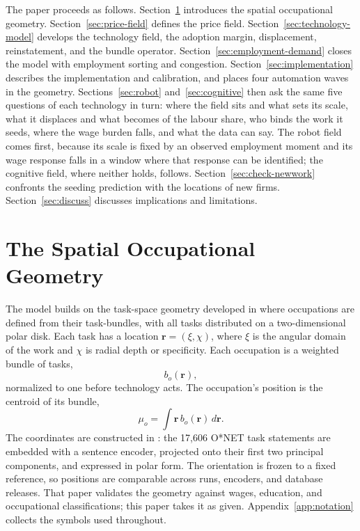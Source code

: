 \documentclass[12pt, a4paper]{article}
\begin{document}
The paper proceeds as follows.
Section~\ref{sec:geometry} introduces the spatial occupational
geometry. Section~\ref{sec:price-field} defines the price field.
Section~\ref{sec:technology-model} develops the technology field, the
adoption margin, displacement, reinstatement, and the bundle operator.
Section~\ref{sec:employment-demand} closes the model with employment
sorting and congestion.
Section~\ref{sec:implementation} describes the implementation and
calibration, and places four automation waves in the geometry.
Sections~\ref{sec:robot} and~\ref{sec:cognitive} then ask the same five
questions of each technology in turn: where the field sits and what sets
its scale, what it displaces and what becomes of the labour share, who
binds the work it seeds, where the wage burden falls, and what the data
can say. The robot field comes first, because its scale is fixed by an
observed employment moment and its wage response falls in a window where
that response can be identified; the cognitive field, where neither
holds, follows.
Section~\ref{sec:check-newwork} confronts the seeding prediction with the
locations of new firms. Section~\ref{sec:discuss} discusses implications
and limitations.

\section{The Spatial Occupational Geometry}
\label{sec:geometry}

The model builds on the task-space geometry developed in
\textcite{storck2026geometry} where occupations are defined from their task-bundles,
with all tasks distributed on a two-dimensional polar disk.
Each task has a location $\mathbf{r}=(\xi,\chi)$, where
$\xi$ is the angular domain of the work and $\chi$ is radial depth or
specificity. Each occupation is a weighted bundle of tasks,
\[
  b_o(\mathbf{r}),
\]
normalized to one before technology acts. The occupation's position is
the centroid of its bundle,
\[
  \mu_o = \int \mathbf{r}\,b_o(\mathbf{r})\,d\mathbf{r}.
\]
The coordinates are constructed in \textcite{storck2026geometry}: the
17{,}606 O*NET task statements are embedded with a sentence encoder,
projected onto their first two principal components, and expressed in
polar form. The orientation is frozen to a fixed reference, so
positions are comparable across runs, encoders, and database releases.
That paper validates the geometry against wages, education, and
occupational classifications; this paper takes it as given.
Appendix~\ref{app:notation} collects the symbols used throughout.
\end{document}
